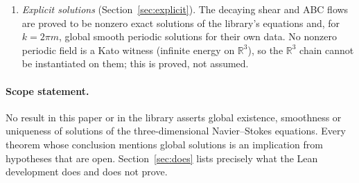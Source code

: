 \documentclass[11pt,a4paper]{article}
\theoremstyle{plain}
\theoremstyle{definition}
\theoremstyle{remark}
\newcommand{\R}{\mathbb{R}}
\begin{document}
\begin{enumerate}[label=(\roman*)]
Their remaining hypotheses are of two kinds (Section~\ref{sec:assumptions}): classical theorems that are
not in Mathlib (Kato local existence, Beale--Kato--Majda continuation, uniqueness), and hypotheses that are
as strong as the open problem itself (a cubic rate or a uniform vorticity bound for all data)
(Sections~\ref{sec:analytic}--\ref{sec:clay}).
\item \emph{Explicit solutions} (Section~\ref{sec:explicit}). The decaying shear and ABC flows are proved to be
nonzero exact solutions of the library's equations and, for $k=2\pi m$, global smooth periodic solutions for
their own data. No nonzero periodic field is a Kato witness (infinite energy on $\R^3$), so the $\R^3$ chain
cannot be instantiated on them; this is proved, not assumed.
\end{enumerate}

\paragraph{Scope statement.} No result in this paper or in the library asserts global existence,
smoothness or uniqueness of solutions of the three-dimensional Navier--Stokes equations. Every theorem whose
conclusion mentions global solutions is an implication from hypotheses that are open. Section~\ref{sec:does}
lists precisely what the Lean development does and does not prove.
\end{document}
